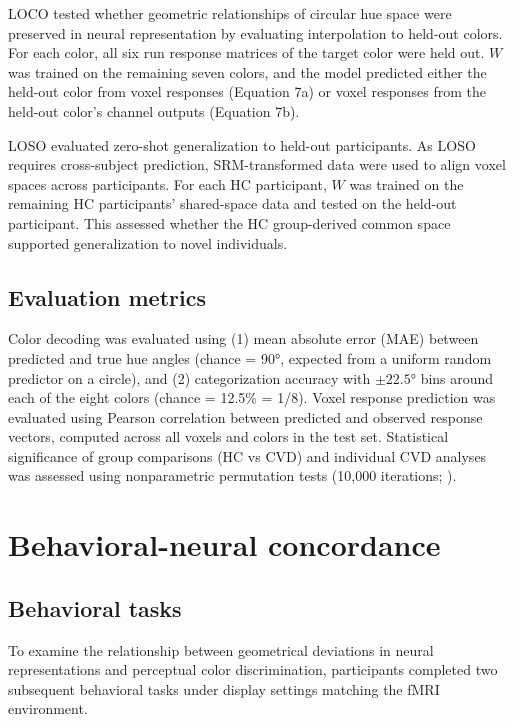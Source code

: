 LOCO tested whether geometric relationships of circular hue space were preserved in neural representation by evaluating interpolation to held-out colors. For each color, all six run response matrices of the target color were held out. $W$ was trained on the remaining seven colors, and the model predicted either the held-out color from voxel responses (Equation 7a) or voxel responses from the held-out color's channel outputs (Equation 7b).

LOSO evaluated zero-shot generalization to held-out participants. As LOSO requires cross-subject prediction, SRM-transformed data were used to align voxel spaces across participants. For each HC participant, $W$ was trained on the remaining HC participants' shared-space data and tested on the held-out participant. This assessed whether the HC group-derived common space supported generalization to novel individuals.

\subsection*{Evaluation metrics}

Color decoding was evaluated using (1) mean absolute error (MAE) between predicted and true hue angles (chance = 90°, expected from a uniform random predictor on a circle), and (2) categorization accuracy with $\pm 22.5$° bins around each of the eight colors (chance = 12.5\% = 1/8). Voxel response prediction was evaluated using Pearson correlation between predicted and observed response vectors, computed across all voxels and colors in the test set. Statistical significance of group comparisons (HC vs CVD) and individual CVD analyses was assessed using nonparametric permutation tests (10,000 iterations; \cite{nichols2002}).

\section{Behavioral-neural concordance}

\subsection*{Behavioral tasks}

To examine the relationship between geometrical deviations in neural representations and perceptual color discrimination, participants completed two subsequent behavioral tasks under display settings matching the fMRI environment.

